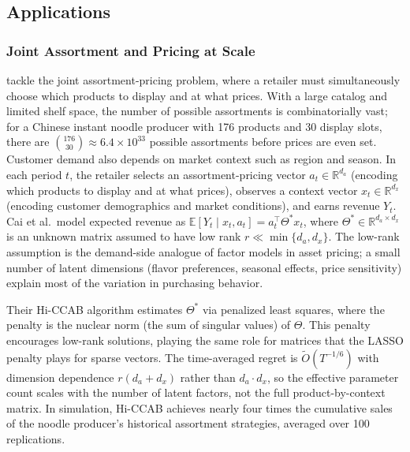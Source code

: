 \subsection{Applications}
\label{sec:dp_applications}

\subsubsection{Joint Assortment and Pricing at Scale}

\citet{Cai2023} tackle the joint assortment-pricing problem, where a retailer must simultaneously choose which products to display and at what prices. With a large catalog and limited shelf space, the number of possible assortments is combinatorially vast; for a Chinese instant noodle producer with 176 products and 30 display slots, there are $\binom{176}{30} \approx 6.4 \times 10^{33}$ possible assortments before prices are even set. Customer demand also depends on market context such as region and season. In each period $t$, the retailer selects an assortment-pricing vector $a_t \in \mathbb{R}^{d_a}$ (encoding which products to display and at what prices), observes a context vector $x_t \in \mathbb{R}^{d_x}$ (encoding customer demographics and market conditions), and earns revenue $Y_t$. Cai et al.\ model expected revenue as $\mathbb{E}[Y_t \mid x_t, a_t] = a_t^\top \Theta^* x_t$, where $\Theta^* \in \mathbb{R}^{d_a \times d_x}$ is an unknown matrix assumed to have low rank $r \ll \min\{d_a, d_x\}$. The low-rank assumption is the demand-side analogue of factor models in asset pricing; a small number of latent dimensions (flavor preferences, seasonal effects, price sensitivity) explain most of the variation in purchasing behavior.

Their Hi-CCAB algorithm estimates $\Theta^*$ via penalized least squares, where the penalty is the nuclear norm (the sum of singular values) of $\Theta$. This penalty encourages low-rank solutions, playing the same role for matrices that the LASSO penalty plays for sparse vectors. The time-averaged regret is $\tilde{O}(T^{-1/6})$ with dimension dependence $r(d_a + d_x)$ rather than $d_a \cdot d_x$, so the effective parameter count scales with the number of latent factors, not the full product-by-context matrix. In simulation, Hi-CCAB achieves nearly four times the cumulative sales of the noodle producer's historical assortment strategies, averaged over 100 replications.

